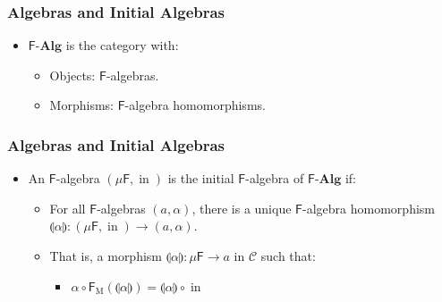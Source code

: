 \documentclass{beamer}
\DeclareMathOperator{\mor}{M}
\newcommand{\comp}{\ensuremath{\mathrel{\circ}}}
\newcommand{\cat}[1]{\ensuremath{\mathcal{#1}}}
\newcommand{\catbf}[1]{\ensuremath{\mathbf{#1}}\xspace}
\newcommand{\alg}{\catbf{Alg}}
\newcommand{\func}[1]{\ensuremath{\mathsf{#1}}}
\newcommand{\funcM}[1]{\ensuremath{\func{#1}_{\mor}}}
\DeclareMathOperator{\inmo}{in}
\newcommand{\cata}[1]{\ensuremath{\llparenthesis#1\rrparenthesis}}
\begin{document}
\begin{frame}
  \frametitle{Algebras and Initial Algebras}

  \begin{definition}
    \begin{itemize}
    \item
      \func{F}-\alg is the category with:
      \begin{itemize}
      \item
        Objects: \func{F}-algebras.
      \item
        Morphisms: \func{F}-algebra homomorphisms.
      \end{itemize}
    \end{itemize}
  \end{definition}

\end{frame}


\begin{frame}
  \frametitle{Algebras and Initial Algebras}

  \begin{definition}
    \begin{itemize}
    \item
      An \func{F}-algebra $(\mu\func{F},\inmo)$ is the initial
      \func{F}-algebra of \func{F}-\alg if:
      \begin{itemize}
      \item
        For all \func{F}-algebras $(a,\alpha)$, there is a unique
        \func{F}-algebra homomorphism $\cata\alpha:
        (\mu\func{F},\inmo) \to (a,\alpha)$.
      \end{itemize}
      \begin{itemize}
      \item
        That is, a morphism $\cata\alpha: \mu\func{F} \to a$ in
        $\cat{C}$ such that:
        \begin{itemize}
        \item
          $\alpha \comp \funcM{F}(\cata\alpha) = \cata\alpha \comp
          \inmo$
        \end{itemize}
      \end{itemize}
    \end{itemize}
  \end{definition}

\end{frame}

\end{document}
